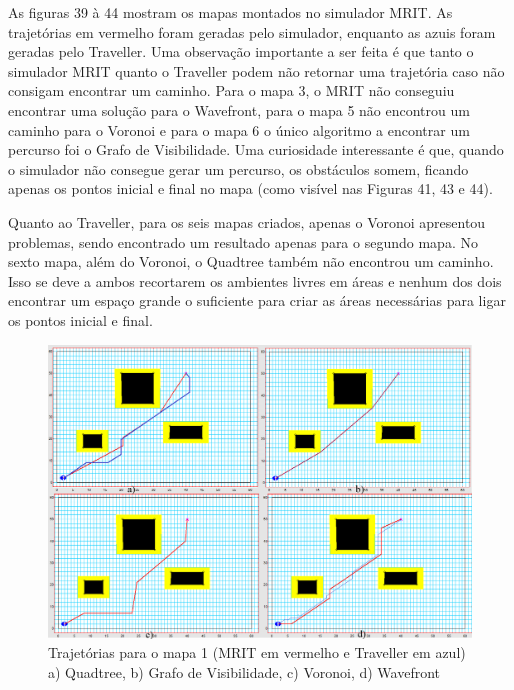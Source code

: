 As figuras 39 à 44 mostram os mapas montados no simulador MRIT. As trajetórias em vermelho foram geradas pelo simulador, enquanto as azuis foram geradas pelo Traveller. Uma observação importante a ser feita é que tanto o simulador MRIT quanto o Traveller podem não retornar uma trajetória caso não consigam encontrar um caminho. Para o mapa 3, o MRIT não conseguiu encontrar uma solução para o Wavefront, para o mapa 5 não encontrou um caminho para o Voronoi e para o mapa 6 o único algoritmo a encontrar um percurso foi o Grafo de Visibilidade. Uma curiosidade interessante é que, quando o simulador não consegue gerar um percurso, os obstáculos somem, ficando apenas os pontos inicial e final no mapa (como visível nas Figuras 41, 43 e 44).

Quanto ao Traveller, para os seis mapas criados, apenas o Voronoi apresentou problemas, sendo encontrado um resultado apenas para o segundo mapa. No sexto mapa, além do Voronoi, o Quadtree também não encontrou um caminho. Isso se deve a ambos recortarem os ambientes livres em áreas e nenhum dos dois encontrar um espaço grande o suficiente para criar as áreas necessárias para ligar os pontos inicial e final.

\begin{figure}[h]
	\centering
	\label{fig39}
		\includegraphics[keepaspectratio=true,scale=0.25]{figuras/mapa1.jpg}
	\caption{Trajetórias para o mapa 1 (MRIT em vermelho e Traveller em azul) a) Quadtree, b) Grafo de Visibilidade, c) Voronoi, d) Wavefront}
\end{figure}


